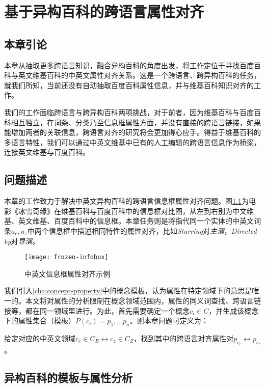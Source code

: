 \chapter{基于异构百科的跨语言属性对齐}
\label{cha:property-matching}

\section{本章引论}
本章从抽取更多跨语言知识，融合异构百科的角度出发，将工作定位于寻找百度百科与英文维基百科的中英文属性对齐关系。这是一个跨语言、跨异构百科的任务，就我们所知，当前还没有自动抽取百度百科属性信息，并与维基百科知识对齐的工作。

我们的工作面临跨语言与跨异构百科两项挑战，对于前者，因为维基百科与百度百科相互独立，在词条、分类乃至信息框属性方面，并没有直接的跨语言链接，如果能增加两者的关联信息，跨语言对齐的研究将会更加得心应手。得益于维基百科的多语言特性，我们可以通过中英文维基中已有的人工编辑的跨语言信息作为桥梁，连接英文维基与百度百科。

\section{问题描述}
本章的工作致力于解决中英文异构百科的跨语言信息框属性对齐问题。图\ref{fig:frozen-infobox}为电影《冰雪奇缘》在维基百科与百度百科中的信息框对比图，从左到右别为中文维基、英文维基、百度百科中的信息框。本章任务则是将指代同一个实体的中英文词条$a_e,a_z$中两个信息框中描述相同特性的属性对齐，比如\textit{Starring}对\textit{主演}，\textit{Directed by}对\textit{导演}。

\begin{figure}[H]
  \centering
  \texttt{[image: frozen-infobox]}
  \caption{中英文信息框属性对齐示例}
  \label{fig:frozen-infobox}
\end{figure}

我们引入\ref{cha:concept-property}中的{\heiti 概念模板}，认为属性在特定领域下的意思是唯一的。本文将对属性的分析限制在概念领域范围内，属性的同义词查找、跨语言链接等，都在同一领域里进行。为此，首先需要确定一个概念$c_i \in C$，并生成该概念下的属性集合（模板）$P(c_i)={p_1,...p_n}$。则本章问题可定义为：

给定对应的中英文领域$c_e \in C_E \leftrightarrow c_z \in C_Z$，找到其中的跨语言对齐属性对$p_{c_e} \leftrightarrow p_{c_z}$。

\section{异构百科的模板与属性分析}
\label{sec:template-property-analysis}

